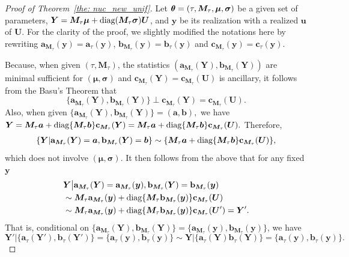 \documentclass[12pt]{article}
\theoremstyle{shortspace}
\def\*#1{\bm{#1}}
\def\btheta{\mathop{\theta\kern-.45em\hbox{$\theta$}}\nolimits}
\def\A{\mathbf a}
\def\B{\mathbf b}
\def\C{\mathbf c}
\newcommand{\diag}{\hbox{diag}}
\begin{document}
\begin{proof}[Proof of Theorem~\ref{the: nuc_new_unif}]
Let $\btheta = (\tau,{\*M_\tau}, \*\mu, \*\sigma)$ be a given set of parameters, $\*Y =\*M_{\tau} \*\mu + \diag(\*M_\tau  {\*\sigma}) \*U$, and $\*y$ be its realization with a realized $\*u$ of $\*U$. 
For the clarity of the proof, we slightly modified the notations here by rewriting $\A_{\*M_\tau}(\*y) = \A_\tau(\*y) $, $\B_{\*M_\tau}(\*y) = \B_\tau(\*y)$ and $\C_{\*M_\tau}(\*y) = \C_\tau(\*y)$.  

Because, when given $(\tau, {\*M}_\tau)$, the statistics  $(\A_{\*M_\tau}(\*Y), \B_{\*M_\tau}(\*Y))$ are minimal sufficient for $(\*\mu, \*\sigma)$ and $\C_{\*M_\tau}(\*Y) = \C_{\*M_\tau}(\*U) $ is ancillary, it follows from the Basu's Theorem that 
$$\{\A_{\*M_\tau}(\*Y),  \B_{\*M_\tau}(\*Y)\} \perp \C_{\*M_\tau}(\*Y) = \C_{\*M_\tau}(\*U).$$ Also, when given  $\{\A_{\*M_\tau}(\*Y),  \B_{\*M_\tau}(\*Y)\} = (\*a, \*b),$ we have 
$\*Y  
=\*M_\tau \*a+ \diag\{\*M_\tau \*b\}\C_{\*M_\tau}(\*Y) 
    = \*M_\tau \*a+ \diag\{\*M_\tau \*b\}\C_{\*M_\tau}(\*U).$
Therefore,
\begin{align}
  \left\{ \*Y|\A_{\*M_\tau}(\*Y)=\*a,\B_{\*M_\tau}(\*Y)=\*b \right\} 
   \sim \{\*M_\tau \*a+ \diag\{\*M_\tau \*b\}\C_{\*M_\tau}(\*U)\}, \nonumber
\end{align}
which does not involve $(\*\mu, \*\sigma).$ 
It then follows from the above that for any fixed $\*y$
\begin{align}
\label{eq:tilde_y_conditional}
   &  \*Y \big|\A_{\*M_\tau}(\*Y)=\A_{\*M_\tau}(\*y),\B_{\*M_\tau}(\*Y)=\B_{\*M_\tau}(\*y)  \nonumber \\
  & \sim \*M_\tau \A_{\*M_\tau}(\*y)+ \diag\{\*M_\tau \B_{\*M_\tau}(\*y)\}\C_{\*M_\tau}(\*U) \nonumber \\
    & \sim \*M_\tau \A_{\*M_\tau}(\*y)+ \diag\{\*M_\tau \B_{\*M_\tau}(\*y)\}\C_{\*M_\tau}({\*U'})= {\*Y}'.
\end{align}
That is, conditional on $\big\{\A_{\*M_\tau}(\*Y),  \B_{\*M_\tau}(\*Y)\big\} =\big\{\A_{\*M_\tau}(\*y), \B_{\*M_\tau}(\*y)\big\}$, we have 
$${\*Y}' \big| \{\A_{\tau}(\*Y'), \B_{\tau}(\*Y')\}=\{\A_{\tau}(\*y),  \B_{\tau}(\*y)\} \sim \*Y \big| \{\A_{\tau}(\*Y) \B_{\tau}(\*Y)\}=\{\A_{\tau}(\*y),  \B_{\tau}(\*y)\}.$$ 



\end{proof}
\end{document}
